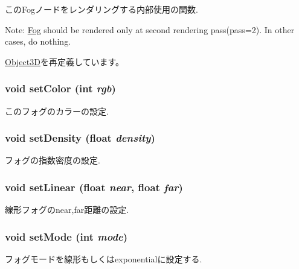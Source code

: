 このFogノードをレンダリングする内部使用の関数.

Note: \hyperlink{classm3g_1_1Fog}{Fog} should be rendered only at second rendering pass(pass=2). In other cases, do nothing. 

\hyperlink{classm3g_1_1Object3D_1efcb1973989d9963d5bd6d03065d389}{Object3D}を再定義しています。\hypertarget{classm3g_1_1Fog_b1f5cc0f5cc6bbbd716a526c61f1081d}{
\subsubsection[{setColor}]{\setlength{\rightskip}{0pt plus 5cm}void setColor (int {\em rgb})}}
\label{classm3g_1_1Fog_b1f5cc0f5cc6bbbd716a526c61f1081d}


このフォグのカラーの設定. \hypertarget{classm3g_1_1Fog_0ceeda25e326e99d6e971e980a00bd49}{
\subsubsection[{setDensity}]{\setlength{\rightskip}{0pt plus 5cm}void setDensity (float {\em density})}}
\label{classm3g_1_1Fog_0ceeda25e326e99d6e971e980a00bd49}


フォグの指数密度の設定. \hypertarget{classm3g_1_1Fog_a46fd556865ae7f1c683c3741b68c168}{
\subsubsection[{setLinear}]{\setlength{\rightskip}{0pt plus 5cm}void setLinear (float {\em near}, \/  float {\em far})}}
\label{classm3g_1_1Fog_a46fd556865ae7f1c683c3741b68c168}


線形フォグのnear,far距離の設定. \hypertarget{classm3g_1_1Fog_9f407b18ba6235cb96fa95611c1ea3a4}{
\subsubsection[{setMode}]{\setlength{\rightskip}{0pt plus 5cm}void setMode (int {\em mode})}}
\label{classm3g_1_1Fog_9f407b18ba6235cb96fa95611c1ea3a4}


フォグモードを線形もしくはexponentialに設定する. 

